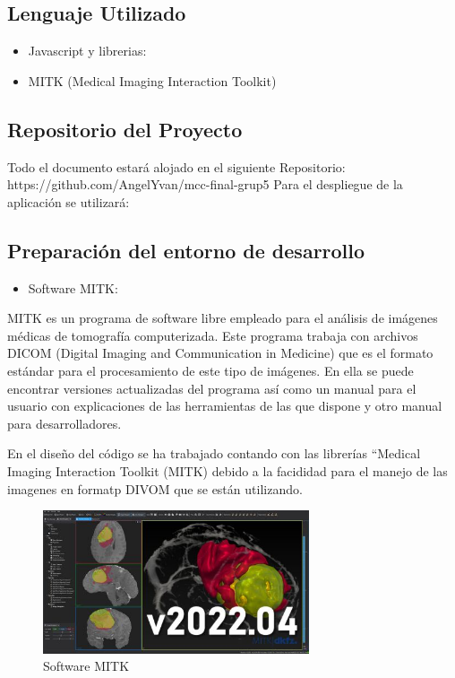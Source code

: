 \documentclass{article}
\begin{document}
\subsection{Lenguaje Utilizado}
\begin{itemize}
	\item Javascript y librerias:
	\item MITK (Medical Imaging Interaction Toolkit)
	\end{itemize}
	


\subsection{Repositorio del Proyecto}

Todo el documento estará alojado en el siguiente Repositorio: https://github.com/AngelYvan/mcc-final-grup5
Para el despliegue de la aplicación se utilizará: 

\subsection{Preparación del entorno de desarrollo}


\begin{itemize}
            \item Software MITK:
\end{itemize}

MITK es un programa de software libre empleado para el análisis de imágenes médicas de
tomografía computerizada. Este programa trabaja con archivos DICOM (Digital Imaging and
Communication in Medicine) que es el formato estándar para el procesamiento de este tipo de
imágenes. En ella se puede encontrar versiones actualizadas del programa así como un manual para el usuario con explicaciones de las herramientas de las que dispone y otro manual para desarrolladores.

En el diseño del código se ha trabajado contando con las librerías “Medical Imaging Interaction Toolkit (MITK) debido a la facididad para el manejo de las imagenes en formatp DIVOM que se están utilizando.

\begin{figure}[H]
\centering
\includegraphics[width=0.7\textwidth]{img/MITK.jpg}
\caption{Software MITK}
\end{figure}
\end{document}
